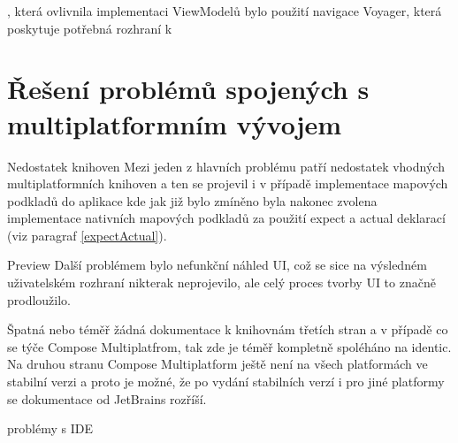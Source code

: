 , která ovlivnila implementaci ViewModelů bylo použití navigace Voyager, která poskytuje potřebná rozhraní k 



\section{Řešení problémů spojených s multiplatformním vývojem} %
Nedostatek knihoven
Mezi jeden z hlavních problému patří nedostatek vhodných multiplatformních knihoven a ten se projevil i v případě implementace mapových podkladů
do aplikace kde jak již bylo zmíněno byla nakonec zvolena implementace nativních mapových podkladů za použití expect a actual deklarací (viz paragraf \ref{expectActual}).

Preview
Další problémem bylo nefunkční náhled UI, což se sice na výsledném uživatelském rozhraní nikterak neprojevilo, ale celý proces tvorby UI to značně 
prodloužilo.

Špatná nebo téměř žádná dokumentace k knihovnám třetích stran a v případě co se týče Compose Multiplatfrom, tak zde je téměř kompletně spoléháno na
identic. 
Na druhou stranu Compose Multiplatform ještě není na všech platformách ve stabilní verzi a proto je možné, že po vydání stabilních verzí i pro jiné
platformy se dokumentace od JetBrains rozříší.

problémy s IDE 


